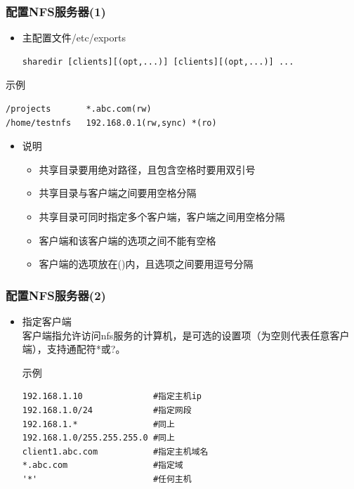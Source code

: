\documentclass[xcolor=svgnames,presentation]{beamer}
\begin{document}
\begin{frame}[fragile]
\frametitle{配置NFS服务器(1)}
\label{sec-1-5}
\begin{itemize}

\item 主配置文件/etc/exports\\
\label{sec-1-5-1}%
\begin{verbatim}
sharedir [clients][(opt,...)] [clients][(opt,...)] ...
\end{verbatim}
\end{itemize} %
\begin{exampleblock}{示例}
\label{sec-1-5-2}


\begin{verbatim}
/projects       *.abc.com(rw)
/home/testnfs   192.168.0.1(rw,sync) *(ro)
\end{verbatim}
\end{exampleblock}
\begin{itemize}

\item 说明
\label{sec-1-5-3}%
\begin{itemize}

\item 共享目录要用绝对路径，且包含空格时要用双引号
\label{sec-1-5-3-1}%

\item 共享目录与客户端之间要用空格分隔
\label{sec-1-5-3-2}%

\item 共享目录可同时指定多个客户端，客户端之间用空格分隔
\label{sec-1-5-3-3}%

\item 客户端和该客户端的选项之间不能有空格
\label{sec-1-5-3-4}%

\item 客户端的选项放在()内，且选项之间要用逗号分隔
\label{sec-1-5-3-5}%
\end{itemize} %
\end{itemize} %
\end{frame}
\begin{frame}[fragile]
\frametitle{配置NFS服务器(2)}
\label{sec-1-6}
\begin{itemize}

\item 指定客户端\\
\label{sec-1-6-1}%
客户端指允许访问nfs服务的计算机，是可选的设置项（为空则代表任意客户端），支持通配符*或?。
\begin{exampleblock}{示例}
\label{sec-1-6-1-1}


\begin{verbatim}
192.168.1.10              #指定主机ip
192.168.1.0/24            #指定网段
192.168.1.*               #同上
192.168.1.0/255.255.255.0 #同上
client1.abc.com           #指定主机域名
*.abc.com                 #指定域
'*'                       #任何主机
\end{verbatim}
\end{exampleblock}
\end{itemize} %
\end{frame}
\end{document}
